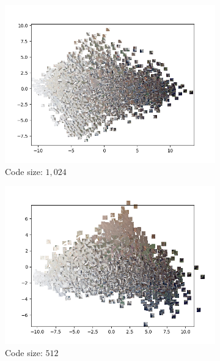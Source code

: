 \begin{figure}[H]
    \centering
    \begin{subfigure}{.5\textwidth}
        \centering
        \includegraphics[width=\textwidth]{images/figures/experiments_latent/pooling_dim1024_PCA_images.png}
        \caption{Code size: $1,024$}
    \end{subfigure}%
    \begin{subfigure}{.5\textwidth}
        \centering
        \includegraphics[width=\textwidth]{images/figures/experiments_latent/pooling_dim512_PCA_images.png}
        \caption{Code size: $512$}
    \end{subfigure}
    \begin{subfigure}{.5\textwidth}

\end{subfigure}
\end{figure}
